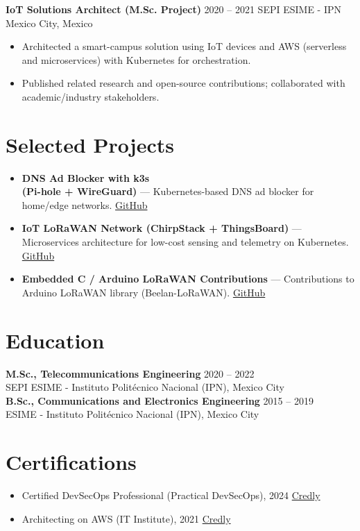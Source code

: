 \documentclass[11pt,a4paper]{article}
\newcommand{\role}[2]{\textbf{#1} \hfill {\small #2}}%
\newcommand{\org}[2]{{#1} \hfill {\small #2}}%
\begin{document}
\role{IoT Solutions Architect (M.Sc. Project)}{2020 -- 2021}
\org{SEPI ESIME - IPN}{Mexico City, Mexico}
\begin{itemize}
  \item Architected a smart-campus solution using IoT devices and AWS (serverless and microservices) with Kubernetes for orchestration.
  \item Published related research and open-source contributions; collaborated with academic/industry stakeholders.
\end{itemize}

\section*{Selected Projects}
\begin{itemize}
  \item \textbf{DNS Ad Blocker with k3s \\ (Pi-hole + WireGuard)} — Kubernetes-based DNS ad blocker for home/edge networks. \href{https://github.com/ivanmorenoj/k3s-pihole-wireguard}{GitHub}
  \item \textbf{IoT LoRaWAN Network (ChirpStack + ThingsBoard)} — Microservices architecture for low-cost sensing and telemetry on Kubernetes. \href{https://github.com/ivanmorenoj/chirpstack-thingsboard}{GitHub}
  \item \textbf{Embedded C / Arduino LoRaWAN Contributions} — Contributions to Arduino LoRaWAN library (Beelan-LoRaWAN). \href{https://github.com/BeelanMX/Beelan-LoRaWAN}{GitHub}
\end{itemize}

\section*{Education}
\textbf{M.Sc., Telecommunications Engineering} \hfill 2020 -- 2022\\
SEPI ESIME - Instituto Politécnico Nacional (IPN), Mexico City\\[4pt]
\textbf{B.Sc., Communications and Electronics Engineering} \hfill 2015 -- 2019\\
ESIME - Instituto Politécnico Nacional (IPN), Mexico City

\section*{Certifications}
\begin{itemize}
  \item Certified DevSecOps Professional (Practical DevSecOps), 2024 \hfill \href{https://www.credly.com/badges/b6ffc094-a1c5-4e28-b08e-192769fa2206/public_url}{Credly}
  \item Architecting on AWS (IT Institute), 2021 \hfill \href{https://www.credly.com/badges/cafb146b-ed0d-4de2-bd07-8628481f3347/public_url}{Credly}
\end{itemize}
\end{document}
